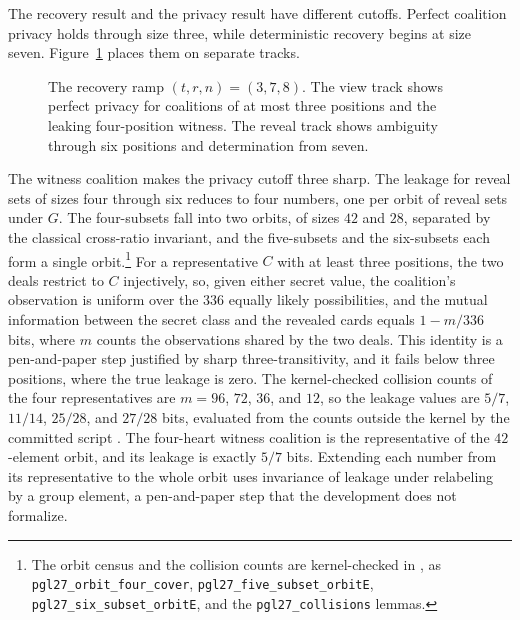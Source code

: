 \documentclass[runningheads]{llncs}
\newcommand{\coqin}[1]{\texttt{#1}}
\begin{document}
The recovery result and the privacy result have different cutoffs. Perfect
coalition privacy holds through size three, while deterministic recovery
begins at size seven. Figure~\ref{fig:ramp} places them on separate tracks.

\begin{figure}[t]
  \centering
  \caption{The recovery ramp $(t,r,n)=(3,7,8)$. The view track shows
  perfect privacy for coalitions of at most three positions and the leaking
  four-position witness. The reveal track shows ambiguity through six
  positions and determination from seven.}
  \label{fig:ramp}
\end{figure}

The witness coalition
makes the privacy cutoff three sharp. The leakage for reveal sets of sizes
four through six reduces to four numbers, one per orbit of reveal sets
under $G$. The four-subsets fall into two orbits, of sizes $42$ and $28$,
separated by the classical cross-ratio invariant, and the five-subsets and
the six-subsets each form a single orbit.\footnote{The orbit census and the collision counts are kernel-checked
in , as
\coqin{pgl27\_orbit\_four\_cover}, \coqin{pgl27\_five\_subset\_orbitE},
\coqin{pgl27\_six\_subset\_orbitE}, and the \coqin{pgl27\_collisions}
lemmas.} For a representative $C$ with at least three positions, the two
deals restrict to $C$ injectively, so, given either secret value, the
coalition's observation is uniform over the $336$ equally likely
possibilities, and the mutual information between the secret class
and the revealed cards equals $1-m/336$ bits, where $m$ counts the
observations shared by the two deals. This identity is a pen-and-paper step
justified by sharp three-transitivity, and it fails below three positions,
where the true leakage is zero. The kernel-checked collision counts of the
four representatives are $m=96$, $72$, $36$, and $12$, so the leakage
values are $5/7$, $11/14$, $25/28$, and $27/28$ bits, evaluated from the
counts outside the kernel by the committed script
. The four-heart
witness coalition is the representative of the $42$-element orbit, and its
leakage is exactly $5/7$ bits. Extending each number from its
representative to the whole orbit uses invariance of leakage under
relabeling by a group element, a pen-and-paper step that the development
does not formalize.
\end{document}
